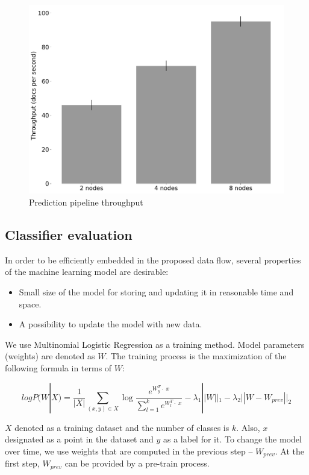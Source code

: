 \begin{figure}[htbp]
  \centering
  \includegraphics[scale=0.25]{pics/classifier_throughput}
  \caption{Prediction pipeline throughput}
  \label {throughput}
\end{figure}

\subsection{Classifier evaluation}

In order to be efficiently embedded in the proposed data flow, several properties of the machine learning model are desirable:
\begin{itemize}
     \item Small size of the model for storing and updating it in reasonable time and space.
     \item A possibility to update the model with new data.
\end{itemize}

We use Multinomial Logistic Regression as a training method. Model parameters (weights) are denoted as $W$. The training process is the maximization of the following formula in terms of $W$:

$$ logP(W | X) = \frac{1}{|X|} \sum \limits_{(x, y) \in X} \log \frac{e^{{W_y^T \cdot \; x}}}{\sum \limits_{l = 1}^{k}  e^{{W_{l}^T \cdot \; x}}} - \lambda_1 ||W||_1 - \lambda_2 ||W - W_{prev}||_2 $$ 

$X$ denoted as a training dataset and the number of classes is $k$. Also, $x$ designated as a point in the dataset and $y$ as a label for it. To change the model over time, we use weights that are computed in the previous step -- $W_{prev}$. At the first step, $W_{prev}$ can be provided by a pre-train process.

